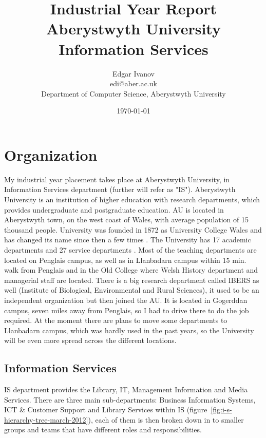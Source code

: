 \documentclass[10pt,a4paper,headinclude=true]{report}
\begin{document}
\onehalfspacing
\title{Industrial Year Report \\ Aberystwyth University Information Services}
\author{Edgar Ivanov\\ edi@aber.ac.uk \\ Department of Computer Science, Aberystwyth University}
\date{\today}

\maketitle

\newpage
\thispagestyle{empty}
\mbox{}

\tableofcontents

\chapter{Organization}
My industrial year placement takes place at Aberystwyth University, in Information Services department (further will refer as "IS"). Aberystwyth University is an institution of higher education with research departments, which provides undergraduate and postgraduate education. AU is located in Aberystwyth town, on the west coast of Wales, with average population of 15 thousand people. University was founded in 1872 as University College Wales and has changed its name since then a few times \cite{History}.
The University has 17 academic departments and 27 service departments \cite{Departments} \cite{Departments2}. Most of the teaching departments are located on Penglais campus, as well as in Llanbadarn campus within 15 min. walk from Penglais and in the Old College where Welsh History department and managerial staff are located. There is a big research department called IBERS as well (Institute of Biological, Environmental and Rural Sciences), it used to be an independent organization but then joined the AU. It is located in Gogerddan campus, seven miles away from Penglais, so I had to drive there to do the job required. At the moment there are plans to move some departments to Llanbadarn campus, which was hardly used in the past years, so the University will be even more spread across the different locations.

\section{Information Services}
IS department provides the Library, IT, Management Information and Media Services. There are three main sub-departments: Business Information Systems, ICT \& Customer Support and Library Services within IS (figure~\ref{fig:i-s-hierarchy-tree-march-2012}), each of them is then broken down in to smaller groups and teams that have different roles and responsibilities.
\end{document}
